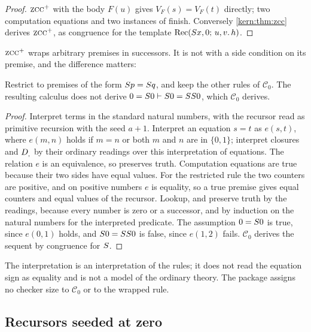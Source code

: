 \begin{proof}
$\rulename{ZCC}^{+}$ with the body $F(u)$ gives $V_F(s)=V_F(t)$ directly;
two computation equations and two instances of  finish.
Conversely \cref{kern:thm:zcc} derives $\rulename{ZCC}^{+}$, as congruence
for the template $\operatorname{Rec}(S x,0;\,u,v.\,h)$.
\end{proof}

$\rulename{ZCC}^{+}$ wraps arbitrary premises in successors.  It is not
 with a side condition on its premise, and the difference
matters:

\begin{proposition}
\label{kern:prop:zcccounter}
Restrict  to premises of the form $S p=S q$, and keep
the other rules of $\mathcal{C}_0$.  The resulting calculus does not derive
$0=S 0\vdash S 0=SS 0$, which $\mathcal{C}_0$ derives.
\end{proposition}

\begin{proof}
Interpret terms in the standard natural numbers, with the recursor read as
primitive recursion with the seed $a+1$.  Interpret an equation $s=t$ as
$e(s,t)$, where $e(m,n)$ holds if $m=n$ or both $m$ and $n$ are in
$\{0,1\}$; interpret closures and $D_{,}$ by their ordinary readings over
this interpretation of equations.  The relation $e$ is an equivalence, so
 preserves truth.  Computation equations are true because their
two sides have equal values.  For the restricted rule the two counters are
positive, and on positive numbers $e$ is equality, so a true premise gives
equal counters and equal values of the recursor.  Lookup,  and
 preserve truth by the readings,  because every
number is zero or a successor, and  by induction on the
natural numbers for the interpreted predicate.  The assumption $0=S 0$ is
true, since $e(0,1)$ holds, and $S 0=SS 0$ is false, since $e(1,2)$
fails.  $\mathcal{C}_0$ derives the sequent by congruence for $S$.
\end{proof}

The interpretation is an interpretation of the rules; it does not read the
equation sign as equality and is not a model of the ordinary theory.  The
package assigns no checker size to $\mathcal{C}_0$ or to the wrapped rule.

\subsection{Recursors seeded at zero}
\label{kern:sec:zerostart}

